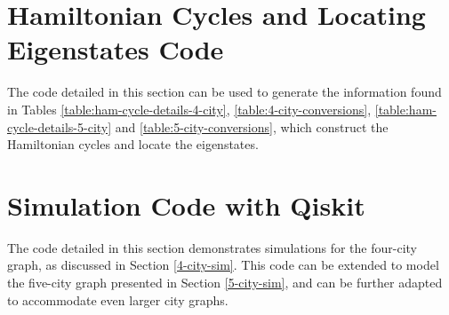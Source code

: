 \documentclass[msc,oneside]{ubcthesis}
\begin{document}
	
	
	
	\appendix
	\chapter{Hamiltonian Cycles and Locating Eigenstates Code}
	
	The code detailed in this section can be used to generate the information found in Tables \ref{table:ham-cycle-details-4-city}, \ref{table:4-city-conversions},  \ref{table:ham-cycle-details-5-city} and \ref{table:5-city-conversions}, which construct the Hamiltonian cycles and locate the eigenstates. 
	
	
	\chapter{Simulation Code with Qiskit}
	
	The code detailed in this section demonstrates simulations for the four-city graph, as discussed in Section \ref{4-city-sim}. This code can be extended to model the five-city graph presented in Section \ref{5-city-sim}, and can be further adapted to accommodate even larger city graphs.
	
	
	
	\backmatter
	
	
	
\end{document}
